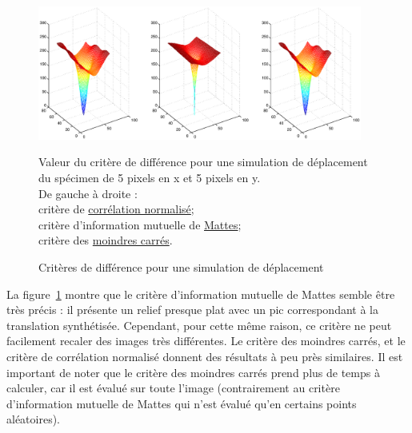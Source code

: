 \begin{figure}[h]
\begin{center}
\leavevmode
\includegraphics[width=0.95\textwidth]{pictures/Recal3DmetricsCMSArtificial}
\end{center}
\caption{Critères de différence pour une simulation de déplacement}{Valeur du critère de différence pour une simulation de déplacement du spécimen de 5 pixels en x et 5 pixels en y.\\
De gauche à droite :\\
critère de \href{http://www.itk.org/Doxygen/html/classitk_1_1NormalizedCorrelationImageToImageMetric.html}{corrélation normalisé};\\
critère d'information mutuelle de \href{http://www.itk.org/Doxygen/html/classitk_1_1MattesMutualInformationImageToImageMetric.html}{Mattes};\\
critère des \href{http://www.itk.org/Doxygen/html/classitk_1_1MeanSquaresImageToImageMetric.html}{moindres carrés}. }
\label{fig:RecalMetricSynthe}
\end{figure}


La figure~\ref{fig:RecalMetricSynthe} montre que le critère d'information mutuelle de Mattes semble être très précis : il présente un relief presque plat avec un pic correspondant à la translation synthétisée. Cependant, pour cette même raison, ce critère ne peut facilement recaler des images très différentes.
Le critère des moindres carrés, et le critère de corrélation normalisé donnent des résultats à peu près similaires. Il est important de noter que le critère des moindres carrés prend plus de temps à calculer, car il est évalué sur toute l'image (contrairement au critère d'information mutuelle de Mattes qui n'est évalué qu'en certains points aléatoires).


